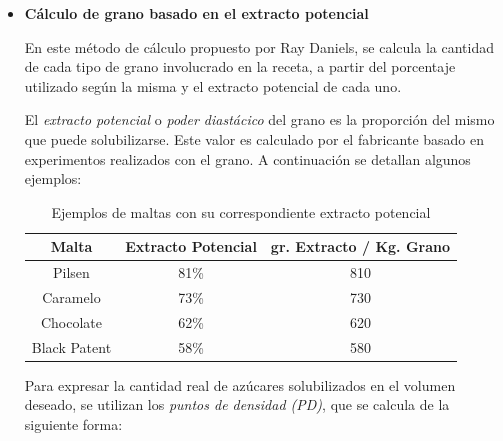                 \begin{itemize}
                    \item \textbf{Cálculo de grano basado en el extracto potencial}
                    \par En este método de cálculo propuesto por Ray Daniels, se calcula la cantidad de cada tipo de grano involucrado en la receta, a partir del porcentaje utilizado según la misma y el extracto potencial de cada uno. 
                    
                        \par El \textit{extracto potencial} o \textit{poder diastácico} del grano es la proporción del mismo que puede solubilizarse. Este valor es calculado por el fabricante basado en experimentos realizados con el grano. A continuación se detallan algunos ejemplos: 
                        \begin{table}[H]
                            \centering
                            \begin{tabular}{| c | c | c |}
                                \hline
                                Malta & Extracto Potencial & gr. Extracto / Kg. Grano \\
                                \hline
                                \hline
                                Pilsen & 81\% & 810
                                \\\hline
                                Caramelo & 73\%  & 730
                                \\\hline
                                Chocolate & 62\% & 620
                                \\\hline
                                Black Patent & 58\% & 580
                                \\\hline
                            \end{tabular}
                            \caption{Ejemplos de maltas con su correspondiente extracto potencial}
                            \label{tab:TablaExtractoPotencial}
                        \end{table}
                        
                        \par Para expresar la cantidad real de azúcares solubilizados en el volumen deseado, se utilizan los \textit{puntos de densidad (PD)}, que se calcula de la siguiente forma:
                        

\end{itemize}
